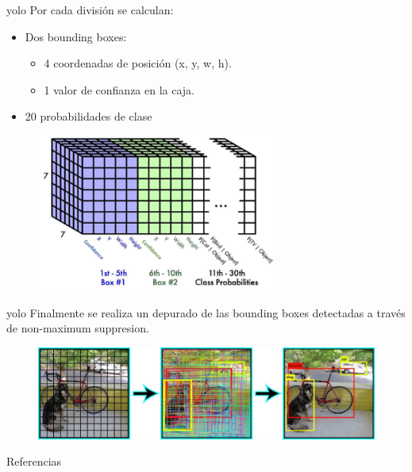 \begin{frame}{\gls{yolo}}
Por cada división se calculan:
\begin{itemize}
    \item \alert{Dos bounding boxes}:
    \begin{itemize}
        \item 4 coordenadas de posición (x, y, w, h).
        \item 1 valor de confianza en la caja.
    \end{itemize}

    \item \alert{20 probabilidades de clase}
\end{itemize}

\begin{figure}
    \centering
    \includegraphics[width=0.7\textwidth]{Slides/figures/Tema 4/YOLO_End.png}
    \caption{\cite{YOLOFinal}}
\end{figure}
\end{frame}

\begin{frame}{\gls{yolo}}
Finalmente se realiza un \alert{depurado} de las \alert{bounding boxes} detectadas a través de \alert{non-maximum suppresion}.

\begin{figure}
    \centering
    \includegraphics[width=\textwidth]{Slides/figures/Tema 4/YOLO_FinalResults.jpg}
    \caption{\cite{YOLOResults}}
\end{figure}
\end{frame}


\begin{frame}[allowframebreaks]{Referencias}
    
    
\end{frame}

